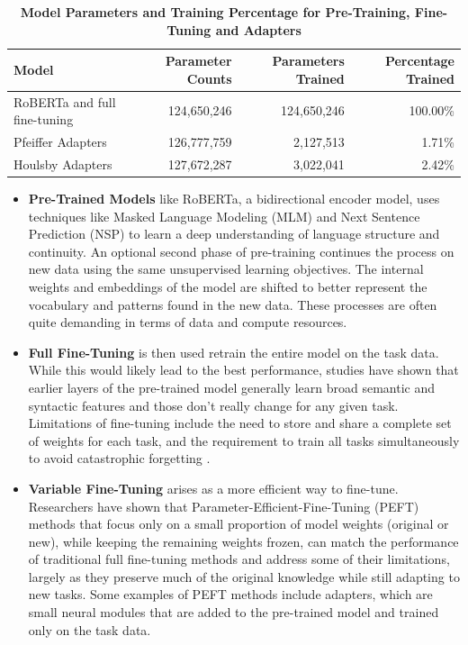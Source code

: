 \documentclass[10pt,twocolumn,letterpaper]{article}
\begin{document}
\begin{table}[h]
    \centering
    \begin{tabular}{ l r r r }
        \hline
        \textbf{Model} & \textbf{Parameter Counts} & \textbf{Parameters Trained} & \textbf{Percentage Trained} \\
        \hline
        RoBERTa and full fine-tuning & 124,650,246 & 124,650,246 & 100.00\% \\
        Pfeiffer Adapters & 126,777,759 & 2,127,513 & 1.71\% \\
        Houlsby Adapters & 127,672,287 & 3,022,041 & 2.42\% \\
        \hline
    \end{tabular}
    \caption{\textbf{Model Parameters and Training Percentage for Pre-Training, Fine-Tuning and Adapters}}
    \label{tab:model-parameters}
\end{table}

\begin{itemize}
\item \textbf{Pre-Trained Models} like RoBERTa, a bidirectional encoder model, uses techniques like Masked Language Modeling (MLM) and Next Sentence Prediction (NSP) to learn a deep understanding of language structure and continuity. An optional second phase of pre-training \cite{gururangan2020dont} continues the process on new data using the same unsupervised learning objectives. The internal weights and embeddings of the model are shifted to better represent the vocabulary and patterns found in the new data. These processes are often quite demanding in terms of data and compute resources.

\item \textbf{Full Fine-Tuning} is then used retrain the entire model on the task data. While this would likely lead to the best performance, studies have shown that earlier layers of the pre-trained model generally learn broad semantic and syntactic features and those don’t really change for any given task. Limitations of fine-tuning include the need to store and share a complete set of weights for each task, and the requirement to train all tasks simultaneously to avoid catastrophic forgetting \cite{mccloskey1989catastrophic}.

\item \textbf{Variable Fine-Tuning} arises as a more efficient way to fine-tune. Researchers have shown that Parameter-Efficient-Fine-Tuning (PEFT) methods that focus only on a small proportion of model weights (original or new), while keeping the remaining weights frozen, can match the performance of traditional full fine-tuning methods \cite{houlsby2019parameter} and address some of their limitations, largely as they preserve much of the original knowledge while still adapting to new tasks. Some examples of PEFT methods include adapters, which are small neural modules that are added to the pre-trained model and trained only on the task data.
\end{itemize}
\end{document}
